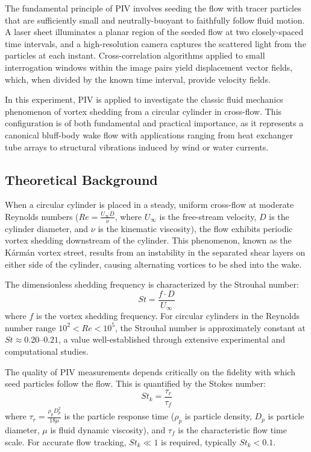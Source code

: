 The fundamental principle of PIV involves seeding the flow with tracer particles that are sufficiently small and neutrally-buoyant to faithfully follow fluid motion. A laser sheet illuminates a planar region of the seeded flow at two closely-spaced time intervals, and a high-resolution camera captures the scattered light from the particles at each instant. Cross-correlation algorithms applied to small interrogation windows within the image pairs yield displacement vector fields, which, when divided by the known time interval, provide velocity fields.

In this experiment, PIV is applied to investigate the classic fluid mechanics phenomenon of vortex shedding from a circular cylinder in cross-flow. This configuration is of both fundamental and practical importance, as it represents a canonical bluff-body wake flow with applications ranging from heat exchanger tube arrays to structural vibrations induced by wind or water currents.

\subsection{Theoretical Background} \label{sec:introduction/theory}

When a circular cylinder is placed in a steady, uniform cross-flow at moderate Reynolds numbers (\(Re = \frac{U_\infty D}{\nu}\), where \(U_\infty\) is the free-stream velocity, \(D\) is the cylinder diameter, and \(\nu\) is the kinematic viscosity), the flow exhibits periodic vortex shedding downstream of the cylinder. This phenomenon, known as the Kármán vortex street, results from an instability in the separated shear layers on either side of the cylinder, causing alternating vortices to be shed into the wake.

The dimensionless shedding frequency is characterized by the Strouhal number:
\begin{equation}
    St = \frac{f \cdot D}{U_\infty}
\end{equation}
where \(f\) is the vortex shedding frequency. For circular cylinders in the Reynolds number range \(10^2 < Re < 10^5\), the Strouhal number is approximately constant at \(St \approx 0.20\text{--}0.21\), a value well-established through extensive experimental and computational studies.

The quality of PIV measurements depends critically on the fidelity with which seed particles follow the flow. This is quantified by the Stokes number:
\begin{equation}
    St_k = \frac{\tau_r}{\tau_f}
\end{equation}
where \(\tau_r = \frac{\rho_p D_p^2}{18\mu}\) is the particle response time (\(\rho_p\) is particle density, \(D_p\) is particle diameter, \(\mu\) is fluid dynamic viscosity), and \(\tau_f\) is the characteristic flow time scale. For accurate flow tracking, \(St_k \ll 1\) is required, typically \(St_k < 0.1\).

